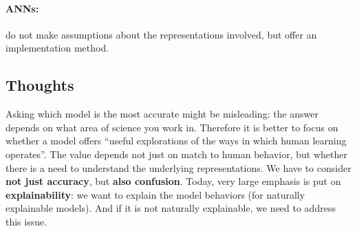 \paragraph{ANNs:} do not make assumptions about the representations involved, but offer an implementation method.

\subsection{Thoughts}
Asking which model is the most accurate might be misleading: the answer depends on what area of science you work in. Therefore it is better to focus on whether a model offers ``useful explorations of the ways in which human learning operates”.
The value depends not just on match to human behavior, but whether there is a need to understand the underlying representations. We have to consider \textbf{not just accuracy}, but \textbf{also confusion}.
Today, very large emphasis is put on \textbf{explainability}: we want to explain the model behaviors (for naturally explainable models). And if it is not naturally explainable, we need to address this issue.
